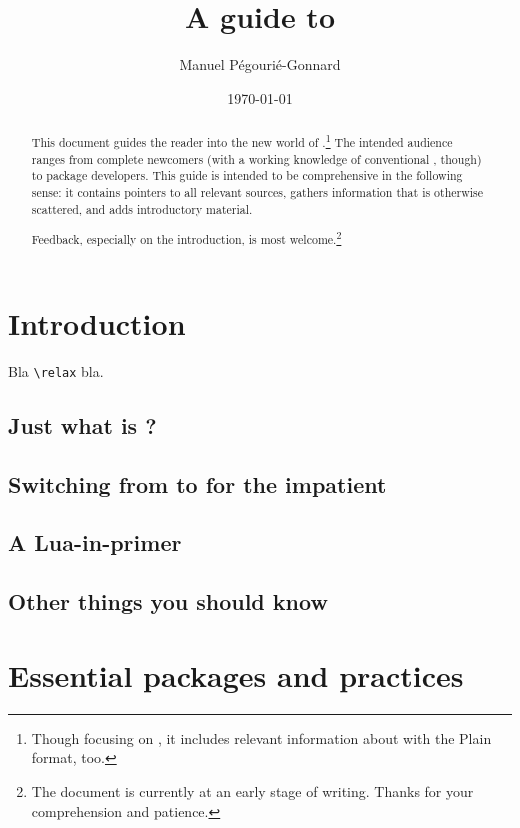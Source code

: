 \documentclass{lltxdoc}
\title{A guide to \lualatex}
\author{Manuel Pégourié-Gonnard \\ \email{mpg@elzevir.fr}}
\date{\today}
\begin{document}
\maketitle

\begin{abstract}
  This document guides the reader into the new world of
  \lualatex.\footnote{Though focusing on \lualatex, it includes relevant
    information about \luatex with the Plain format, too.} The intended
  audience ranges from complete newcomers (with a working knowledge of
  conventional \latex, though) to package developers. This guide is
  intended to be comprehensive in the following sense: it contains pointers to
  all relevant sources, gathers information that is otherwise scattered,
  and adds introductory material.

  Feedback, especially on the introduction, is most welcome.\footnote{The
    document is currently at an early stage of writing.  Thanks for your
    comprehension and patience.}
\end{abstract}

\setcounter{tocdepth}{2}
\tableofcontents
\clearpage

\section{Introduction}

Bla \verb+\relax+ bla.

\subsection{Just what is \lualatex?}

\subsection{Switching from \latex to \lualatex for the impatient}

\subsection{A Lua-in-\tex primer}

\subsection{Other things you should know}

\section{Essential packages and practices}
\end{document}
